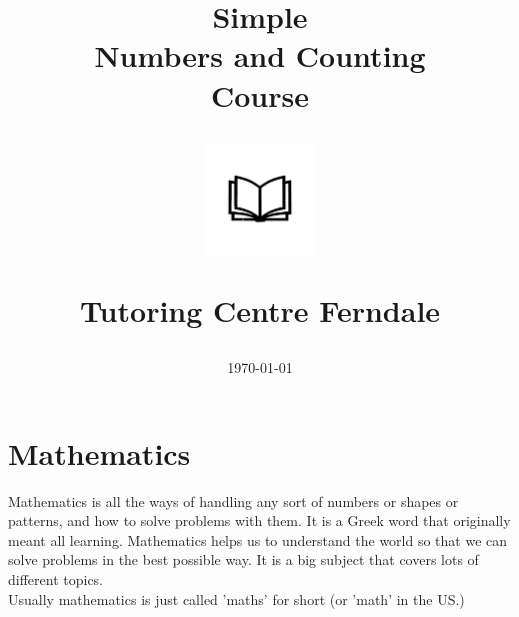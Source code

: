\documentclass{article}
\begin{document}
	
	\title{Simple\\Numbers and Counting\\Course\\
		\begin{center}
			\includegraphics[width=4em]{ApS_logo.png}
		\end{center}
		\begin{normalsize}Tutoring Centre Ferndale \end{normalsize}}
	\author{}
	\date{\today}
	
\maketitle

\newpage

\section*{Mathematics} Mathematics is all the ways of handling any sort of numbers or shapes or patterns, and how to solve problems with them. It is a Greek word that originally meant all learning. Mathematics helps us to understand the world so that we can solve problems in the best possible way. It is a big subject that covers lots of different topics.\\

Usually mathematics is just called 'maths' for short (or 'math' in the US.)
\end{document}
